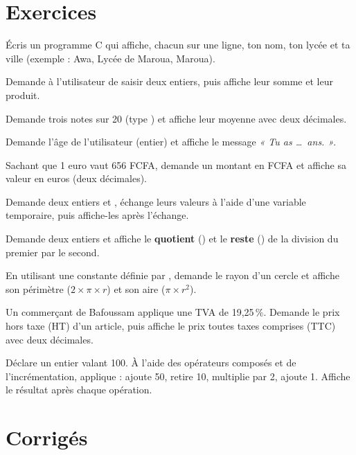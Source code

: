 
\section{Exercices}


Écris un programme C qui affiche, chacun sur une ligne, ton nom, ton lycée et ta
ville (exemple : Awa, Lycée de Maroua, Maroua).

Demande à l'utilisateur de saisir deux entiers, puis affiche leur somme et leur
produit.

Demande trois notes sur 20 (type ) et affiche leur moyenne avec deux
décimales.

Demande l'âge de l'utilisateur (entier) et affiche le message
\emph{« Tu as \dots\ ans. »}.


Sachant que 1 euro vaut 656 FCFA, demande un montant en FCFA et affiche sa valeur
en euros (deux décimales).

Demande deux entiers  et , échange leurs valeurs à l'aide d'une
variable temporaire, puis affiche-les après l'échange.

Demande deux entiers et affiche le \textbf{quotient} (\code{/}) et le
\textbf{reste} (\code{\%}) de la division du premier par le second.

En utilisant une constante  définie par , demande le rayon
d'un cercle et affiche son périmètre ($2 \times \pi \times r$) et son aire
($\pi \times r^2$).

Un commerçant de Bafoussam applique une TVA de 19,25\,\%. Demande le prix hors
taxe (HT) d'un article, puis affiche le prix toutes taxes comprises (TTC) avec
deux décimales.

Déclare un entier  valant 100. À l'aide des opérateurs composés et de
l'incrémentation, applique : ajoute 50, retire 10, multiplie par 2, ajoute 1.
Affiche le résultat après chaque opération.

\section{Corrigés}

